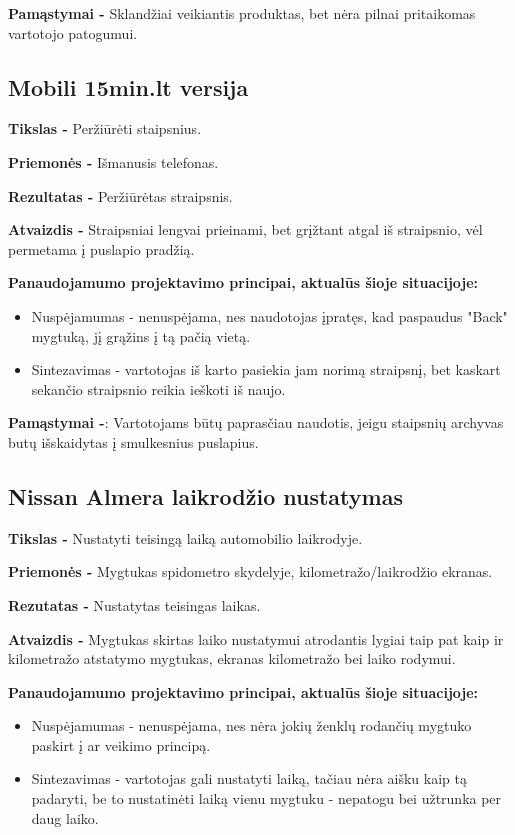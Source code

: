 ﻿\documentclass[a4paper, 12pt]{article}
\begin{document}
		\textbf{Pamąstymai -}
		Sklandžiai veikiantis produktas, bet nėra pilnai pritaikomas vartotojo patogumui.

	\subsection{Mobili 15min.lt versija}	
		\textbf{Tikslas -}
		Peržiūrėti staipsnius.

		\textbf{Priemonės -}
		Išmanusis telefonas.

		\textbf{Rezultatas -}
		Peržiūrėtas straipsnis.

		\textbf{Atvaizdis -}
		Straipsniai lengvai prieinami, bet grįžtant atgal iš straipsnio, vėl permetama į puslapio pradžią.
		
		\textbf{Panaudojamumo projektavimo principai, aktualūs šioje situacijoje:}
		\begin{itemize}
		\item Nuspėjamumas - nenuspėjama, nes naudotojas įpratęs, kad paspaudus "Back" mygtuką, jį grąžins į tą pačią vietą.
		\item Sintezavimas - vartotojas iš karto pasiekia jam norimą straipsnį, bet kaskart sekančio straipsnio reikia ieškoti iš naujo.	
		\end{itemize}

		\textbf{Pamąstymai -}:
		Vartotojams būtų paprasčiau naudotis, jeigu staipsnių archyvas butų išskaidytas į smulkesnius puslapius.

	\subsection{Nissan Almera laikrodžio nustatymas}
		\textbf{Tikslas -}
		Nustatyti teisingą laiką automobilio laikrodyje.

		\textbf{Priemonės -}
		Mygtukas spidometro skydelyje, kilometražo/laikrodžio ekranas.

		\textbf{Rezutatas -}
		Nustatytas teisingas laikas.

		\textbf{Atvaizdis -}
		Mygtukas skirtas laiko nustatymui atrodantis lygiai taip pat kaip ir kilometražo atstatymo mygtukas,
		ekranas kilometražo bei laiko rodymui.
		
		\textbf{Panaudojamumo projektavimo principai, aktualūs šioje situacijoje:}
		\begin{itemize}
		\item Nuspėjamumas - nenuspėjama, nes nėra jokių ženklų rodančių mygtuko paskirt į ar veikimo principą.
		\item Sintezavimas - vartotojas gali nustatyti laiką, tačiau nėra aišku kaip tą padaryti, be
		to nustatinėti laiką vienu mygtuku - nepatogu bei užtrunka per daug laiko.
		\end{itemize}
\end{document}
